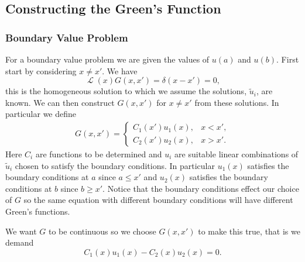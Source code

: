 \documentclass[fleqn]{NotesClass}
\DeclareMathOperator{\linop}{\mathcal{L}}
\begin{document}
    \subsection{Constructing the Green's Function}
    \subsubsection{Boundary Value Problem}
    For a boundary value problem we are given the values of \(u(a)\) and \(u(b)\).
    First start by considering \(x \ne x'\).
    We have
    \begin{equation}
        \linop(x) G(x, x') = \delta(x - x') = 0,
    \end{equation}
    this is the homogeneous solution to which we assume the solutions, \(\tilde{u}_i\), are known.
    We can then construct \(G(x, x')\) for \(x \ne x'\) from these solutions.
    In particular we define
    \begin{align}
        G(x, x') = 
        \begin{cases}
            C_1(x')u_1(x), & x < x',\\
            C_2(x')u_2(x), & x > x'.
        \end{cases}
    \end{align}
    Here \(C_i\) are functions to be determined and \(u_i\) are suitable linear combinations of \(\tilde{u}_i\) chosen to satisfy the boundary conditions.
    In particular \(u_1(x)\) satisfies the boundary conditions at \(a\) since \(a \le x'\) and \(u_2(x)\) satisfies the boundary conditions at \(b\) since \(b \ge x'\).
    Notice that the boundary conditions effect our choice of \(G\) so the same equation with different boundary conditions will have different Green's functions.
    
    We want \(G\) to be continuous so we choose \(G(x, x')\) to make this true, that is we demand
    \begin{equation}
        C_1(x)u_1(x) - C_2(x)u_2(x) = 0.
    \end{equation}
    
\end{document}
